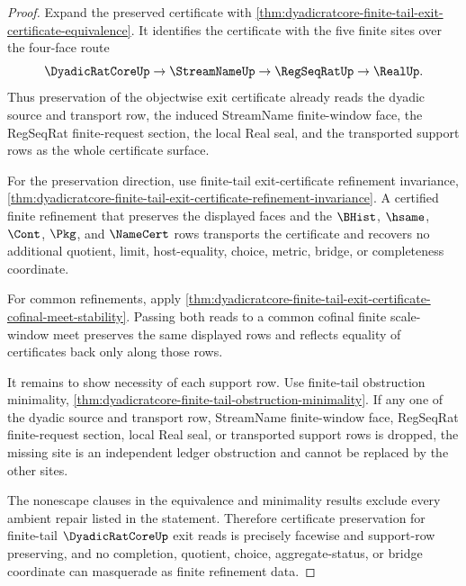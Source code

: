 \begin{proof}
Expand the preserved certificate with \autoref{thm:dyadicratcore-finite-tail-exit-certificate-equivalence}. It identifies the certificate with the five finite sites over the four-face route
$$
\DyadicRatCoreUp \to \StreamNameUp \to \RegSeqRatUp \to \RealUp.
$$
Thus preservation of the objectwise exit certificate already reads the dyadic source and transport row, the induced StreamName finite-window face, the RegSeqRat finite-request section, the local Real seal, and the transported support rows as the whole certificate surface.

For the preservation direction, use finite-tail exit-certificate refinement invariance, \autoref{thm:dyadicratcore-finite-tail-exit-certificate-refinement-invariance}. A certified finite refinement that preserves the displayed faces and the $\BHist$, $\hsame$, $\Cont$, $\Pkg$, and $\NameCert$ rows transports the certificate and recovers no additional quotient, limit, host-equality, choice, metric, bridge, or completeness coordinate.

For common refinements, apply \autoref{thm:dyadicratcore-finite-tail-exit-certificate-cofinal-meet-stability}. Passing both reads to a common cofinal finite scale-window meet preserves the same displayed rows and reflects equality of certificates back only along those rows.

It remains to show necessity of each support row. Use finite-tail obstruction minimality, \autoref{thm:dyadicratcore-finite-tail-obstruction-minimality}. If any one of the dyadic source and transport row, StreamName finite-window face, RegSeqRat finite-request section, local Real seal, or transported support rows is dropped, the missing site is an independent ledger obstruction and cannot be replaced by the other sites.

The nonescape clauses in the equivalence and minimality results exclude every ambient repair listed in the statement. Therefore certificate preservation for finite-tail $\DyadicRatCoreUp$ exit reads is precisely facewise and support-row preserving, and no completion, quotient, choice, aggregate-status, or bridge coordinate can masquerade as finite refinement data.
\end{proof}
